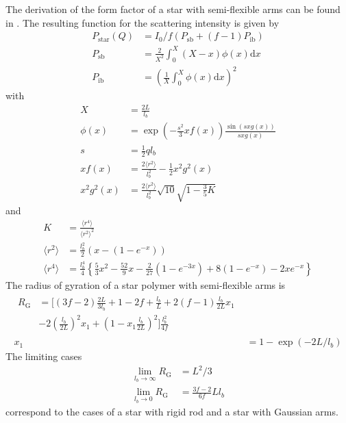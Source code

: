 The derivation of the form factor of a star with semi-flexible arms can be found in \cite{Koyama1973,Koyama1974,Huber1989,Poetschke2000}. The resulting function for the
scattering intensity is given by
\begin{align}
 P_\mathrm{star}(Q) &= I_0/f\left(P_\mathrm{sb} + (f-1)P_\mathrm{ib} \right) \\
 P_\mathrm{sb} &= \frac{2}{X^2}\int_0^X (X-x)\phi(x)\mathrm{d}x \\
 P_\mathrm{ib} &= \left(\frac{1}{X}\int_0^X \phi(x)\mathrm{d}x\right)^2
\end{align}
with
\begin{align}
X &= \frac{2L}{l_b} \\
\phi(x) &= \exp\left(-\frac{s^2}{3}xf(x)\right) \frac{\sin(sxg(x))}{sxg(x)} \\
s &= \frac12 ql_b \\
xf(x) &= \frac{2\langle r^2\rangle}{l_b^2} - \frac12 x^2g^2(x) \\
x^2g^2(x) &= \frac{2\langle r^2\rangle}{l_b^2} \sqrt{10}\sqrt{1-\frac35 K}
\end{align}
and
\begin{align}
K &= \frac{\langle r^4\rangle}{\langle r^2\rangle^2} \\
\langle r^2\rangle &= \frac{l_b^2}{2} \left(x-\left(1-e^{-x}\right)\right)\\
\langle r^4\rangle &= \frac{l_b^4}{4} \left\{\frac53 x^2 -\frac{52}{9}x-\frac{2}{27}\left(1-e^{-3x}\right)+8\left(1-e^{-x}\right)-2xe^{-x}\right\}
\end{align}
The radius of gyration of a star polymer with semi-flexible arms is \cite{Mansfield1980,Huber1989}
\begin{align}
\begin{split}
R_\mathrm{G} &=
\Bigg[(3f - 2)\frac{2L}{3l_b} + 1 - 2f +
   \frac{l_b}{L} + 2(f - 1)\frac{l_b}{2L} x_1 \\
   & -2\left(\frac{l_b}{2L}\right)^2 x_1 + \left(1 - x_1\frac{l_b}{2L}\right)^2\Bigg]\frac{l_b^2}{4f}
\end{split} \\[3mm]
x_1 &= 1-\exp\left(-2L/l_b\right)
\end{align}
The limiting cases
\begin{align}
\lim_{l_b\to\infty} R_\mathrm{G} &= L^2/3 \\
\lim_{l_b\to 0} R_\mathrm{G} &= \frac{3f-2}{6f} Ll_b
\end{align}
correspond to the cases of a star with rigid rod and a star with Gaussian arms.

